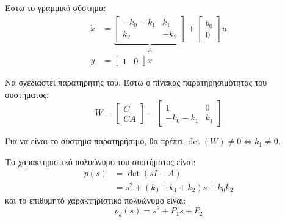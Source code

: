 \documentclass[11pt,a4paper,notitlepage,fleqn]{article}
\begin{document}
\begin{exercise}
	Έστω το γραμμικό σύστημα:
	\begin{align*}
		\dot x &= \underbrace{\left[\begin{matrix}
		-k_0 - k_1 & k_1 \\ k_2 & -k_2
		\end{matrix}\right]}_{A} + \left[\begin{matrix}
	b_0 \\ 0
	\end{matrix}\right]u\\
	y &= \left[\begin{matrix}
	1 & 0
	\end{matrix}\right]x
	\end{align*}

	Να σχεδιαστεί παρατηρητής του.
	\tcblower
	Έστω ο πίνακας παρατηρησιμότητας του συστήματος:
	\[
	W = \left[\begin{matrix}
	C \\ CA
	\end{matrix}\right] = \left[\begin{matrix}
	1 & 0 \\ -k_0-k_1 & k_1
	\end{matrix}\right]
	\]

	Για να είναι το σύστημα παρατηρήσιμο, θα πρέπει \( \det(W) \neq 0 \iff k_1 \neq 0 \).

	Το χαρακτηριστικό πολυώνυμο του συστήματος είναι:
	\begin{align*}
		p(s) &= \det(sI-A) \\&=
		s^2 + (k_0+k_1+k_2)s + k_0k_2
	\end{align*}
	και το επιθυμητό χαρακτηριστικό πολυώνυμο είναι:
	\[
	p_d(s) = s^2 + P_1 s + P_2
	\]


\end{exercise}
\end{document}

